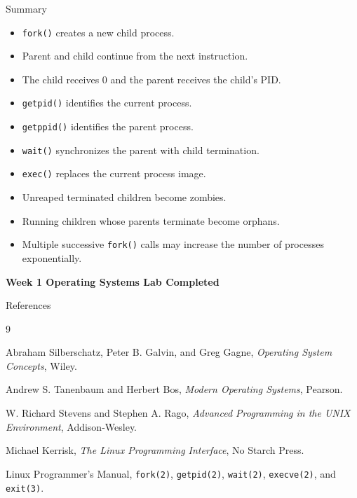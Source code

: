 \documentclass[aspectratio=169]{beamer}
\begin{document}
\begin{frame}{Summary}

\begin{itemize}
    \item \texttt{fork()} creates a new child process.
    \item Parent and child continue from the next instruction.
    \item The child receives 0 and the parent receives the child's PID.
    \item \texttt{getpid()} identifies the current process.
    \item \texttt{getppid()} identifies the parent process.
    \item \texttt{wait()} synchronizes the parent with child termination.
    \item \texttt{exec()} replaces the current process image.
    \item Unreaped terminated children become zombies.
    \item Running children whose parents terminate become orphans.
    \item Multiple successive \texttt{fork()} calls may increase the number of
    processes exponentially.
\end{itemize}

\begin{center}
\vspace{0.3cm}
\Large\textbf{Week 1 Operating Systems Lab Completed}
\end{center}

\end{frame}

\begin{frame}{References}

\small

\begin{thebibliography}{9}

Abraham Silberschatz, Peter B. Galvin, and Greg Gagne,
\newblock \emph{Operating System Concepts},
\newblock Wiley.

Andrew S. Tanenbaum and Herbert Bos,
\newblock \emph{Modern Operating Systems},
\newblock Pearson.

W. Richard Stevens and Stephen A. Rago,
\newblock \emph{Advanced Programming in the UNIX Environment},
\newblock Addison-Wesley.

Michael Kerrisk,
\newblock \emph{The Linux Programming Interface},
\newblock No Starch Press.

Linux Programmer's Manual,
\newblock \texttt{fork(2)}, \texttt{getpid(2)}, \texttt{wait(2)},
\texttt{execve(2)}, and \texttt{exit(3)}.

\end{thebibliography}

\end{frame}

\end{document}

